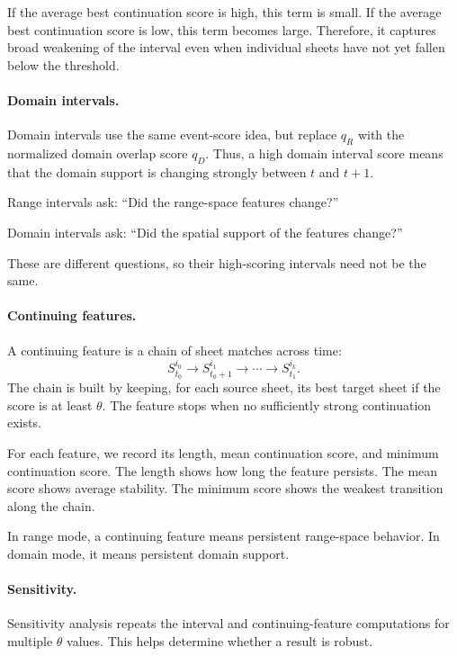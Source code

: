   If the average best continuation score is high, this term is small. If the average best continuation score is low, this
  term becomes large. Therefore, it captures broad weakening of the interval even when individual sheets have not yet
  fallen below the threshold.





  \paragraph{Domain intervals.}
  Domain intervals use the same event-score idea, but replace $q_R$ with the normalized domain overlap score $q_D$. Thus, a
  high domain interval score means that the domain support is changing strongly between $t$ and $t+1$.

  Range intervals ask: ``Did the range-space features change?''

  Domain intervals ask: ``Did the spatial support of the features change?''

  These are different questions, so their high-scoring intervals need not be the same.

  \paragraph{Continuing features.}
  A continuing feature is a chain of sheet matches across time:
  \[
  S_{t_0}^{i_0}
  \rightarrow
  S_{t_0+1}^{i_1}
  \rightarrow
  \cdots
  \rightarrow
  S_{t_1}^{i_k}.
  \]
  The chain is built by keeping, for each source sheet, its best target sheet if the score is at least $\theta$. The
  feature stops when no sufficiently strong continuation exists.

  For each feature, we record its length, mean continuation score, and minimum continuation score. The length shows how
  long the feature persists. The mean score shows average stability. The minimum score shows the weakest transition along
  the chain.

  In range mode, a continuing feature means persistent range-space behavior. In domain mode, it means persistent domain
  support.

  \paragraph{Sensitivity.}
  Sensitivity analysis repeats the interval and continuing-feature computations for multiple $\theta$ values. This helps
  determine whether a result is robust.

